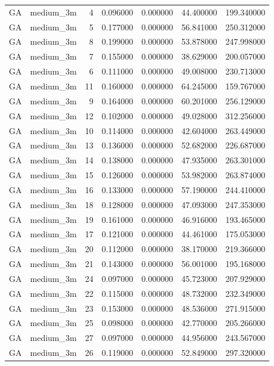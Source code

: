 \begin{tabular}{llrrrrr}
GA & medium_3m & 4 & 0.096000 & 0.000000 & 44.400000 & 199.340000 \\
GA & medium_3m & 5 & 0.177000 & 0.000000 & 56.841000 & 250.312000 \\
GA & medium_3m & 8 & 0.199000 & 0.000000 & 53.878000 & 247.998000 \\
GA & medium_3m & 7 & 0.155000 & 0.000000 & 38.629000 & 200.057000 \\
GA & medium_3m & 6 & 0.111000 & 0.000000 & 49.008000 & 230.713000 \\
GA & medium_3m & 11 & 0.160000 & 0.000000 & 64.245000 & 159.767000 \\
GA & medium_3m & 9 & 0.164000 & 0.000000 & 60.201000 & 256.129000 \\
GA & medium_3m & 12 & 0.102000 & 0.000000 & 49.028000 & 312.256000 \\
GA & medium_3m & 10 & 0.114000 & 0.000000 & 42.604000 & 263.449000 \\
GA & medium_3m & 13 & 0.136000 & 0.000000 & 52.682000 & 226.687000 \\
GA & medium_3m & 14 & 0.138000 & 0.000000 & 47.935000 & 263.301000 \\
GA & medium_3m & 15 & 0.126000 & 0.000000 & 53.982000 & 263.874000 \\
GA & medium_3m & 16 & 0.133000 & 0.000000 & 57.190000 & 244.410000 \\
GA & medium_3m & 18 & 0.128000 & 0.000000 & 47.093000 & 247.353000 \\
GA & medium_3m & 19 & 0.161000 & 0.000000 & 46.916000 & 193.465000 \\
GA & medium_3m & 17 & 0.121000 & 0.000000 & 44.461000 & 175.053000 \\
GA & medium_3m & 20 & 0.112000 & 0.000000 & 38.170000 & 219.366000 \\
GA & medium_3m & 21 & 0.143000 & 0.000000 & 56.001000 & 195.168000 \\
GA & medium_3m & 24 & 0.097000 & 0.000000 & 45.723000 & 207.929000 \\
GA & medium_3m & 22 & 0.115000 & 0.000000 & 48.732000 & 232.349000 \\
GA & medium_3m & 23 & 0.153000 & 0.000000 & 48.536000 & 271.915000 \\
GA & medium_3m & 25 & 0.098000 & 0.000000 & 42.770000 & 205.266000 \\
GA & medium_3m & 27 & 0.097000 & 0.000000 & 44.956000 & 243.567000 \\
GA & medium_3m & 26 & 0.119000 & 0.000000 & 52.849000 & 297.320000 \\

\end{tabular}
